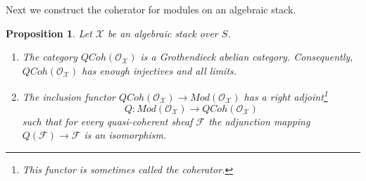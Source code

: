 \documentclass{stacks-project}
\theoremstyle{plain}
\newtheorem{proposition}[subsection]{Proposition}
\theoremstyle{definition}
\theoremstyle{remark}
\numberwithin{equation}{subsection}
\def\QCoh{\mathit{QCoh}}
\begin{document}
\noindent
Next we construct the coherator for modules on an algebraic stack.

\begin{proposition}
\label{proposition-coherator}
Let $\mathcal{X}$ be an algebraic stack over $S$.
\begin{enumerate}
\item The category $\QCoh(\mathcal{O}_\mathcal{X})$ is a Grothendieck
abelian category. Consequently, $\QCoh(\mathcal{O}_\mathcal{X})$
has enough injectives and all limits.
\item The inclusion functor
$\QCoh(\mathcal{O}_\mathcal{X}) \to
\textit{Mod}(\mathcal{O}_\mathcal{X})$ has a right adjoint\footnote{This
functor is sometimes called the {\it coherator}.}
$$
Q :
\textit{Mod}(\mathcal{O}_\mathcal{X})
\longrightarrow
\QCoh(\mathcal{O}_\mathcal{X})
$$
such that for every quasi-coherent sheaf $\mathcal{F}$ the adjunction mapping
$Q(\mathcal{F}) \to \mathcal{F}$ is an isomorphism.
\end{enumerate}
\end{proposition}
\end{document}
